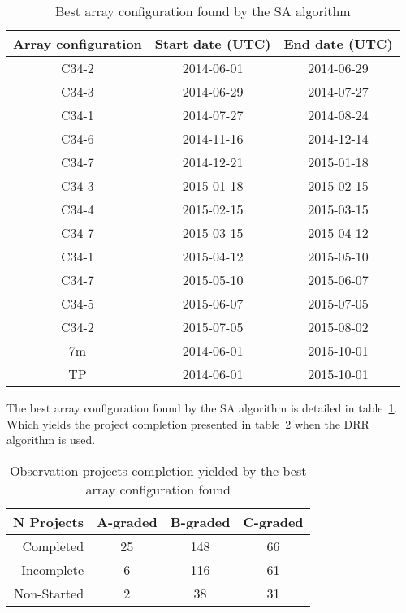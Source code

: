 \begin{table}[htbp]
\begin{center}
\begin{tabular}{|c|c|c|}
\hline
\textbf{Array configuration} & \textbf{Start date (UTC)} & \textbf{End date (UTC)} \\ \hline
C34-2 & 2014-06-01 & 2014-06-29  \\ \hline
C34-3 & 2014-06-29 & 2014-07-27 \\ \hline
C34-1 & 2014-07-27 & 2014-08-24 \\ \hline
C34-6 & 2014-11-16 & 2014-12-14 \\ \hline
C34-7 & 2014-12-21 & 2015-01-18 \\ \hline
C34-3 & 2015-01-18 & 2015-02-15 \\ \hline
C34-4 & 2015-02-15 & 2015-03-15 \\ \hline
C34-7 & 2015-03-15 & 2015-04-12 \\ \hline
C34-1 & 2015-04-12 & 2015-05-10 \\ \hline
C34-7 & 2015-05-10 & 2015-06-07 \\ \hline
C34-5 & 2015-06-07 & 2015-07-05  \\ \hline
C34-2 & 2015-07-05 & 2015-08-02  \\ \hline
7m & 2014-06-01 & 2015-10-01 \\ \hline
TP & 2014-06-01 & 2015-10-01 \\ \hline
\end{tabular}
\end{center}
\caption{Best array configuration found by the SA algorithm}
\label{table:best-arr-conf}
\end{table}

The best array configuration found by the SA algorithm is detailed in table~\ref{table:best-arr-conf}. Which yields the project completion presented in table~\ref{table:best-solution-found} when the DRR algorithm is used.

\begin{table}[htbp]
\centering
\begin{tabular}{|r|c|c|c|} \hline
\textbf{N Projects} & \textbf{A-graded} & \textbf{B-graded} & \textbf{C-graded} \\ \hline
 Completed & 25 & 148 & 66 \\ \hline
 Incomplete & 6 & 116 & 61 \\ \hline
 Non-Started & 2 & 38 & 31 \\ \hline
\end{tabular}
\caption{Observation projects completion yielded by the best array configuration found}
\label{table:best-solution-found}
\end{table}

